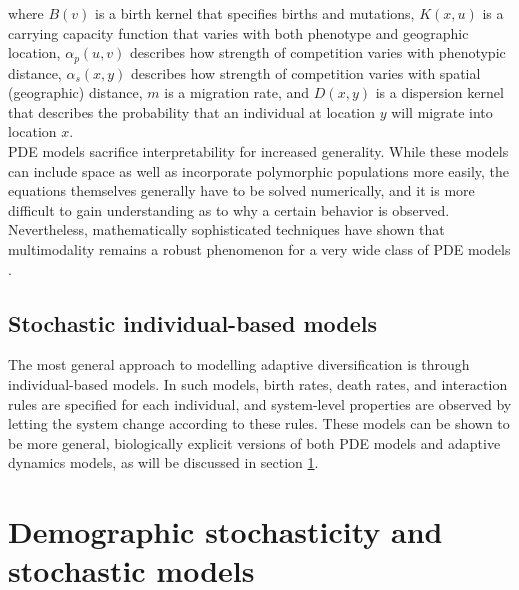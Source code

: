 where $B(v)$ is a birth kernel that specifies births and mutations, $K(x,u)$ is a carrying capacity function that varies with both phenotype and geographic location, $\alpha_p(u,v)$ describes how strength of competition varies with phenotypic distance, $\alpha_s(x,y)$ describes how strength of competition varies with spatial (geographic) distance, $m$ is a migration rate, and $D(x,y)$ is a dispersion kernel that describes the probability that an individual at location $y$ will migrate into location $x$.\\
PDE models sacrifice interpretability for increased generality. While these models can include space as well as incorporate polymorphic populations more easily, the equations themselves generally have to be solved numerically, and it is more difficult to gain understanding as to why a certain behavior is observed. Nevertheless, mathematically sophisticated techniques have shown that multimodality remains a robust phenomenon for a very wide class of PDE models \citep{elmhirst_pod_2008,doebeli_adaptive_2011}.

\subsection{Stochastic individual-based models}

The most general approach to modelling adaptive diversification is through individual-based models. In such models, birth rates, death rates, and interaction rules are specified for each individual, and system-level properties are observed by letting the system change according to these rules. These models can be shown to be more general, biologically explicit versions of both PDE models and adaptive dynamics models, as will be discussed in section \ref{dem_stoch}.

\section{Demographic stochasticity and stochastic models}\label{dem_stoch}

